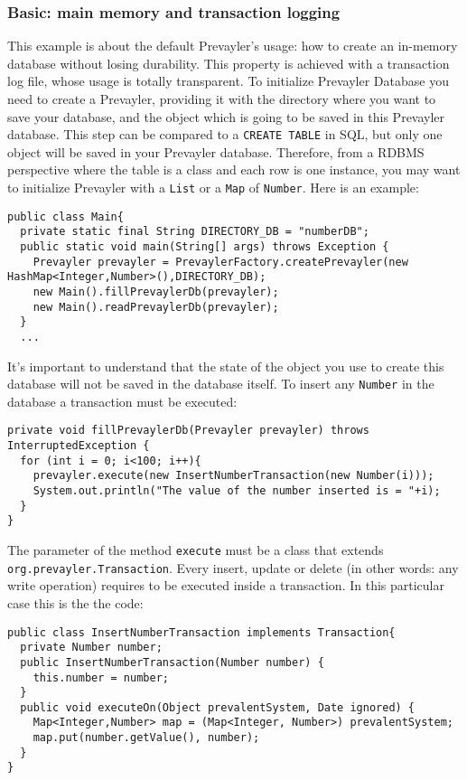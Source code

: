 			\subsubsection{Basic: main memory and transaction logging}	
			This example is about the default Prevayler's usage: how to create an in-memory database 
			without losing durability. This property is achieved with a transaction log file, whose usage 
			is totally transparent.
			To initialize Prevayler Database you need to create a Prevayler, providing it with 
			the directory where you want to save your database, and the object which is going to be saved in 
			this Prevayler database. This step can be compared 
			to a \lstinline!CREATE TABLE! in SQL, but only one object will be saved in your Prevayler database. 
			Therefore, from a RDBMS perspective where the table is a class and each row is one instance, 
			you may want to initialize Prevayler with a \lstinline!List! or a \lstinline!Map! 
			of \lstinline!Number!. Here is an example:
			\begin{lstlisting}
public class Main{
  private static final String DIRECTORY_DB = "numberDB";
  public static void main(String[] args) throws Exception {
    Prevayler prevayler = PrevaylerFactory.createPrevayler(new HashMap<Integer,Number>(),DIRECTORY_DB);		
    new Main().fillPrevaylerDb(prevayler);
    new Main().readPrevaylerDb(prevayler);
  }
  ...
			\end{lstlisting}			
			
			It's important to understand that the state of the object you use 
			to create this database will not be saved in the database itself. To insert any \lstinline!Number! 
			in the database a transaction must be executed:
			\begin{lstlisting} 
private void fillPrevaylerDb(Prevayler prevayler) throws InterruptedException {		
  for (int i = 0; i<100; i++){			
    prevayler.execute(new InsertNumberTransaction(new Number(i)));			
    System.out.println("The value of the number inserted is = "+i);
  }
}
			\end{lstlisting}
		
			The parameter of the method \lstinline!execute! must be a class that extends \lstinline!org.prevayler.Transaction!. 
			Every insert, update or delete (in other words: any write operation) requires to be executed inside a transaction.
			In this particular case this is the the code:			
			\begin{lstlisting} 
public class InsertNumberTransaction implements Transaction{
  private Number number;
  public InsertNumberTransaction(Number number) {
    this.number = number;
  }
  public void executeOn(Object prevalentSystem, Date ignored) {
    Map<Integer,Number> map = (Map<Integer, Number>) prevalentSystem;		
    map.put(number.getValue(), number);		
  }
}			
			\end{lstlisting}

